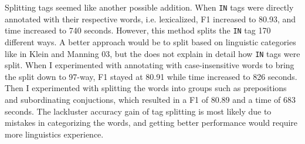 \documentclass[11pt]{article}
\begin{document}
Splitting tags seemed like another possible addition. When \texttt{IN} tags were directly
annotated with their respective words, i.e. lexicalized, F1 increased to 80.93, and time increased to
740 seconds. However, this method splits the \texttt{IN} tag 170 different ways. A better approach
would be to split based on linguistic categories like in Klein and Manning 03,
but the does not explain in detail how \texttt{IN} tags were split. When I experimented with
annotating with case-insensitive words to bring the split down to 97-way, F1 stayed at 80.91
while time increased to 826 seconds. Then I experimented with splitting the words into groups
such as prepositions and subordinating conjuctions, which resulted in a F1 of 80.89 and a time of
683 seconds. The lackluster accuracy gain of tag splitting is most likely due to mistakes in
categorizing the words, and getting better performance would require more linguistics experience.
\end{document}
